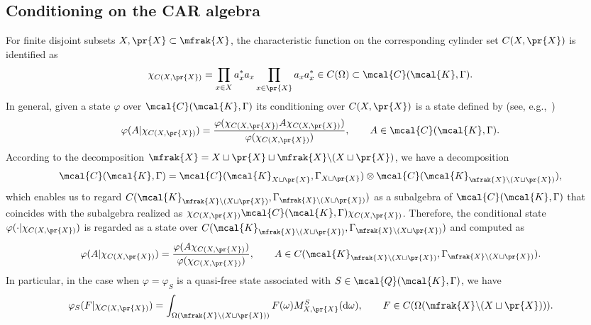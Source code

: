 \subsection{Conditioning on the CAR algebra}\label{subsect:conditioning_CAR_alg}
For finite disjoint subsets $X, \pr{X}\subset\mfrak{X}$, the characteristic function on the corresponding cylinder set $C(X,\pr{X})$ is identified as
\begin{equation*}
	\chi_{C(X,\pr{X})}=\prod_{x\in X}a_{x}^{\ast}a_{x} \prod_{x\in \pr{X}} a_{x}a_{x}^{\ast}\in C(\Omega)\subset \mcal{C}(\mcal{K},\Gamma).
\end{equation*}
In general, given a state $\varphi$ over $\mcal{C}(\mcal{K},\Gamma)$ its conditioning over $C(X,\pr{X})$ is a state defined by (see, e.g.,~\cite{RedeiSummers2006})
\begin{equation*}
	\varphi (A|\chi_{C(X,\pr{X})})=\frac{\varphi (\chi_{C(X,\pr{X})}A\chi_{C(X,\pr{X})})}{\varphi (\chi_{C(X,\pr{X})})},\qquad A\in \mcal{C}(\mcal{K},\Gamma).
\end{equation*}
According to the decomposition $\mfrak{X}=X\sqcup \pr{X}\sqcup \mfrak{X}\backslash (X\sqcup\pr{X})$, we have a decomposition
\begin{equation*}
	\mcal{C}(\mcal{K},\Gamma)=\mcal{C}(\mcal{K}_{X\sqcup \pr{X}},\Gamma_{X\sqcup\pr{X}})\otimes \mcal{C}(\mcal{K}_{\mfrak{X}\backslash (X\sqcup\pr{X})}),
\end{equation*}
which enables us to regard $C(\mcal{K}_{\mfrak{X}\backslash (X\sqcup\pr{X})},\Gamma_{\mfrak{X}\backslash (X\sqcup\pr{X})})$ as a subalgebra of $\mcal{C}(\mcal{K},\Gamma)$ that coincides with the subalgebra realized as $\chi_{C(X,\pr{X})}\mcal{C}(\mcal{K},\Gamma)\chi_{C(X,\pr{X})}$.
Therefore, the conditional state $\varphi (\cdot|\chi_{C(X,\pr{X})})$ is regarded as a state over $C(\mcal{K}_{\mfrak{X}\backslash (X\sqcup\pr{X})},\Gamma_{\mfrak{X}\backslash (X\sqcup\pr{X})})$ and computed as
\begin{equation*}
	\varphi (A|\chi_{C(X,\pr{X})})=\frac{\varphi (A\chi_{C(X,\pr{X})})}{\varphi (\chi_{C(X,\pr{X})})},\qquad A\in C(\mcal{K}_{\mfrak{X}\backslash (X\sqcup\pr{X})},\Gamma_{\mfrak{X}\backslash (X\sqcup\pr{X})}).
\end{equation*}
In particular, in the case when $\varphi=\varphi_{S}$ is a quasi-free state associated with $S\in \mcal{Q}(\mcal{K},\Gamma)$, we have
\begin{equation*}
	\varphi_{S}(F|\chi_{C(X,\pr{X})})=\int_{\Omega (\mfrak{X}\backslash (X\sqcup\pr{X}))}F(\omega)M^{S}_{X,\pr{X}}({\rm d}\omega),\qquad F\in C(\Omega (\mfrak{X}\backslash (X\sqcup\pr{X}))).
\end{equation*}

